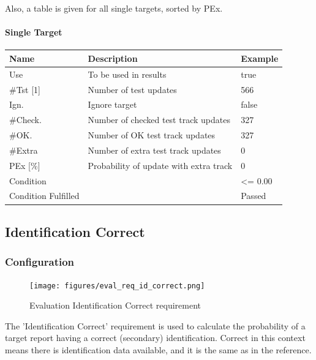 Also, a table is given for all single targets, sorted by PEx.

\paragraph{Single Target}

\begin{center}
 \begin{table}[H]
  \begin{tabularx}{\textwidth}{ | l | X |  l | }
    \hline
    \textbf{Name} & \textbf{Description} & \textbf{Example} \\ \hline
    Use & To be used in results & true \\ \hline
    \#Tst [1] & Number of test updates & 566 \\ \hline
    Ign. & Ignore target & false \\ \hline
    \#Check. & Number of checked test track updates & 327 \\ \hline
    \#OK. & Number of OK test track updates & 327 \\ \hline
    \#Extra & Number of extra test track updates & 0 \\ \hline
    PEx [\%] & Probability of update with extra track & 0 \\ \hline
    Condition &  & <= 0.00 \\ \hline
    Condition Fulfilled &  & Passed \\ \hline
\end{tabularx}
\end{table}
\end{center}


\subsection{Identification Correct}
\label{sec:eval_req_id_correct} 

\subsubsection{Configuration}

\begin{figure}[H]
    \texttt{[image: figures/eval\_req\_id\_correct.png]}
  \caption{Evaluation Identification Correct requirement}
\end{figure}

The 'Identification Correct' requirement is used to calculate the probability of a target report having a correct (secondary) identification. Correct in this context means there is identification data available, 
and it is the same as in the reference. \\

